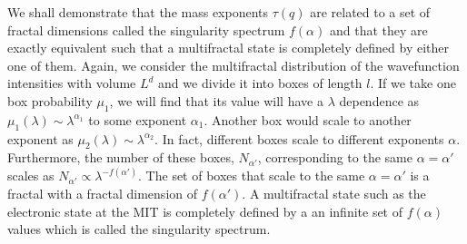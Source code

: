 We shall demonstrate that the mass exponents $\tau(q)$ are related to a set of fractal dimensions
called the singularity spectrum $f(\alpha)$ and that they
are exactly equivalent such that a multifractal state is completely
defined by either one of them.
Again, we consider the multifractal distribution of the wavefunction intensities
with volume $L^d$ and we divide it into boxes of length $l$.  If we take one box
probability $\mu_1$, we will find that its value will have a $\lambda$ dependence as
$\mu_1(\lambda)\sim\lambda^{\alpha_1}$ to some exponent $\alpha_1$.  Another
box would scale to another exponent as $\mu_2(\lambda)\sim\lambda^{\alpha_2}$.  In fact, different boxes scale
to different exponents $\alpha$.  Furthermore, the number of these boxes, $N_{\alpha'}$, corresponding to
the same $\alpha=\alpha'$ scales as $N_{\alpha'}\propto\lambda^{-f(\alpha')}$.  The set of boxes that scale to the same $\alpha=\alpha'$ is a fractal with a fractal dimension of $f(\alpha')$.  A multifractal state such as the electronic state at the MIT is completely defined by a an infinite set of $f(\alpha)$ values which is called the singularity spectrum.

